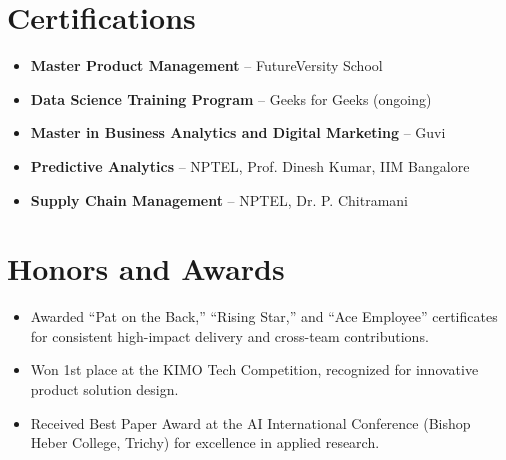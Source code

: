 \documentclass[letterpaper,11pt]{article}
\begin{document}
\section{Certifications}
  \begin{itemize}[leftmargin=0.15in, label={}]
    \item \small{\textbf{Master Product Management} -- FutureVersity School} \\[5pt]
    \item \small{\textbf{Data Science Training Program} -- Geeks for Geeks (ongoing)} \\[5pt]
    \item \small{\textbf{Master in Business Analytics and Digital Marketing} -- Guvi} \\[5pt]
    \item \small{\textbf{Predictive Analytics} -- NPTEL, Prof. Dinesh Kumar, IIM Bangalore} \\[5pt]
    \item \small{\textbf{Supply Chain Management} -- NPTEL, Dr. P. Chitramani} \\[5pt]
  \end{itemize}

\section{Honors and Awards}
  \begin{itemize}[leftmargin=0.15in, label={}]
    \item \small{Awarded ``Pat on the Back,'' ``Rising Star,'' and ``Ace Employee'' certificates for consistent high-impact delivery and cross-team contributions.} \\[5pt]
    \item \small{Won 1st place at the KIMO Tech Competition, recognized for innovative product solution design.} \\[5pt]
    \item \small{Received Best Paper Award at the AI International Conference (Bishop Heber College, Trichy) for excellence in applied research.}
  \end{itemize}
\end{document}
